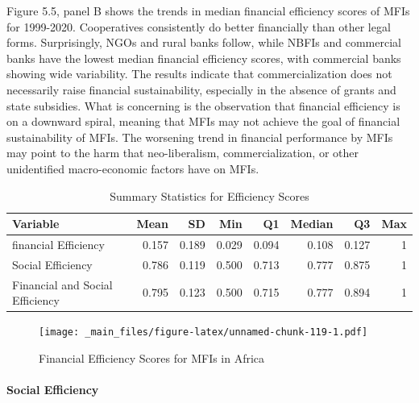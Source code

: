 \documentclass[a4paper, nobind]{templates/ociamthesis}
\begin{document}
Figure 5.5, panel B shows the trends in median financial efficiency scores of MFIs for 1999-2020. Cooperatives consistently do better financially than other legal forms. Surprisingly, NGOs and rural banks follow, while NBFIs and commercial banks have the lowest median financial efficiency scores, with commercial banks showing wide variability. The results indicate that commercialization does not necessarily raise financial sustainability, especially in the absence of grants and state subsidies. What is concerning is the observation that financial efficiency is on a downward spiral, meaning that MFIs may not achieve the goal of financial sustainability of MFIs. The worsening trend in financial performance by MFIs may point to the harm that neo-liberalism, commercialization, or other unidentified macro-economic factors have on MFIs.

\begin{table}

\caption{\label{tab:unnamed-chunk-118}Summary Statistics for Efficiency Scores}
\centering
\fontsize{9}{11}\selectfont
\begin{tabular}[t]{lrrrrrrr}
\toprule
Variable & Mean & SD & Min & Q1 & Median & Q3 & Max\\
\midrule
financial Efficiency & 0.157 & 0.189 & 0.029 & 0.094 & 0.108 & 0.127 & 1\\
Social Efficiency & 0.786 & 0.119 & 0.500 & 0.713 & 0.777 & 0.875 & 1\\
Financial and Social Efficiency & 0.795 & 0.123 & 0.500 & 0.715 & 0.777 & 0.894 & 1\\
\bottomrule
\end{tabular}
\end{table}

\begin{landscape}

\newpage

\begin{figure}
\centering
\texttt{[image: \_main\_files/figure-latex/unnamed-chunk-119-1.pdf]}
\caption{\label{fig:unnamed-chunk-119}Financial Efficiency Scores for MFIs in Africa}
\end{figure}

\end{landscape}

\newpage

\hypertarget{social-efficiency}{%
\paragraph{Social Efficiency}\label{social-efficiency}}
\end{document}
